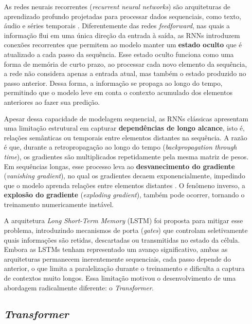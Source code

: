 As redes neurais recorrentes (\textit{recurrent neural networks}) são arquiteturas de aprendizado profundo projetadas para processar dados sequenciais, como texto, áudio e séries temporais \cite{elman1990}. Diferentemente das redes \textit{feedforward}, nas quais a informação flui em uma única direção da entrada à saída, as RNNs introduzem conexões recorrentes que permitem ao modelo manter um \textbf{estado oculto} que é atualizado a cada passo da sequência. Esse estado oculto funciona como uma forma de memória de curto prazo, ao processar cada novo elemento da sequência, a rede não considera apenas a entrada atual, mas também o estado produzido no passo anterior. Dessa forma, a informação se propaga ao longo do tempo, permitindo que o modelo leve em conta o contexto acumulado dos elementos anteriores ao fazer sua predição.
 
Apesar dessa capacidade de modelagem sequencial, as RNNs clássicas apresentam
uma limitação estrutural em capturar \textbf{dependências de longo alcance}, isto é, relações semânticas ou temporais entre elementos distantes na sequência. A razão é que, durante a retropropagação ao longo do tempo (\textit{backpropagation through time}), os gradientes são multiplicados repetidamente pela mesma matriz de pesos. Em sequências longas, esse processo leva ao \textbf{desvanecimento do gradiente}
(\textit{vanishing gradient}), no qual os gradientes decaem exponencialmente,
impedindo que o modelo aprenda relações entre elementos distantes
\cite{hochreiter1991}. O fenômeno inverso, a \textbf{explosão do gradiente}
(\textit{exploding gradient}), também pode ocorrer, tornando o treinamento
numericamente instável.
 
A arquitetura \textit{Long Short-Term Memory} (LSTM) \cite{hochreiter1997} foi proposta para mitigar esse problema, introduzindo mecanismos de porta (\textit{gates}) que controlam seletivamente quais informações são retidas, descartadas ou transmitidas no estado da célula. Embora as LSTMs tenham representado um avanço significativo, ambas as arquiteturas permanecem inerentemente sequenciais, cada passo depende do anterior, o que limita a paralelização durante o treinamento e dificulta a captura de contextos muito longos. Essa limitação motivou o
desenvolvimento de uma abordagem radicalmente diferente: o \textit{Transformer}.

\subsection{\textit{Transformer}}

